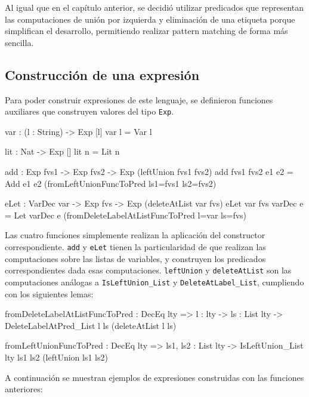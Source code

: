 Al igual que en el capítulo anterior, se decidió utilizar predicados que representan las computaciones de unión por izquierda y eliminación de una etiqueta porque simplifican el desarrollo, permitiendo realizar pattern matching de forma más sencilla.

\subsection{Construcción de una expresión}

Para poder construir expresiones de este lenguaje, se definieron funciones auxiliares que construyen valores del tipo \texttt{Exp}.

\begin{code}
var : (l : String) -> Exp [l]
var l = Var l

lit : Nat -> Exp []
lit n = Lit n

add : Exp fvs1 -> Exp fvs2 -> Exp (leftUnion fvs1 fvs2)
add {fvs1} {fvs2} e1 e2 = Add e1 e2
  (fromLeftUnionFuncToPred {ls1=fvs1} {ls2=fvs2})

eLet : VarDec var -> Exp fvs -> Exp (deleteAtList var fvs)
eLet {var} {fvs} varDec e = Let varDec e 
  (fromDeleteLabelAtListFuncToPred {l=var} {ls=fvs})
\end{code}

Las cuatro funciones simplemente realizan la aplicación del constructor correspondiente. \texttt{add} y \texttt{eLet} tienen la particularidad de que realizan las computaciones sobre las listas de variables, y construyen los predicados correspondientes dada esas computaciones. \texttt{leftUnion} y \texttt{deleteAtList} son las computaciones análogas a \texttt{IsLeftUnion\_List} y \texttt{DeleteAtLabel\_List}, cumpliendo con los siguientes lemas:

\begin{code}
fromDeleteLabelAtListFuncToPred : DecEq lty => {l : lty} -> 
  {ls : List lty} -> 
  DeleteLabelAtPred_List l ls (deleteAtList l ls)

fromLeftUnionFuncToPred : DecEq lty => {ls1, ls2 : List lty} -> 
  IsLeftUnion_List {lty} ls1 ls2 (leftUnion ls1 ls2)   
\end{code}

A continuación se muestran ejemplos de expresiones construidas con las funciones anteriores:


